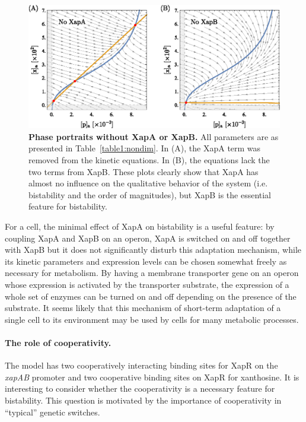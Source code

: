 \documentclass[10pt,letterpaper]{article}
\begin{document}
	\begin{figure}%
		\centering
		\includegraphics{media/Fig6_xapAB.eps}
		\caption{{\bf Phase portraits without XapA or XapB.}
			All parameters are as presented in Table~\ref{table1:nondim}. In
			(A), the XapA term was removed from the kinetic equations. In (B),
			the equations lack the two terms from XapB. These plots clearly show
			that XapA has almost no influence on the qualitative behavior of the
			system (i.e. bistability and the order of magnitudes), but XapB is
			the essential feature for bistability.}
		\label{fig6:xapAB}
	\end{figure}
	
	For a cell, the minimal effect of XapA on bistability is a useful feature: by coupling XapA and XapB on an
	operon, XapA is switched on and off together with XapB but it does not
	significantly disturb this adaptation mechanism, while its kinetic
	parameters and expression levels can be chosen 
	somewhat freely as necessary for metabolism. By
	having a membrane transporter gene on an operon whose expression is
	activated by the transporter substrate, the expression of a whole set of
	enzymes can be turned on and off depending on the presence of the substrate.
	It seems likely that this mechanism of short-term adaptation of a single cell to
	its environment may be used by cells for many metabolic processes.
	
	\paragraph*{The role of cooperativity.} 
	The model has two cooperatively interacting binding sites for XapR on the
	\emph{xapAB} promoter and two cooperative binding sites on XapR for
	xanthosine. It is interesting to consider whether the cooperativity is
	a necessary feature for bistability. This question is motivated by the importance of
	cooperativity in ``typical'' genetic switches\cite{Gardner2000,Cherry2000}.
	
\end{document}
